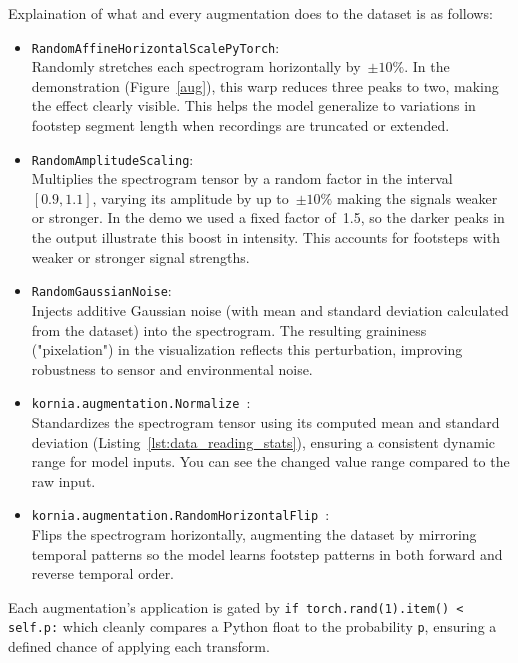 Explaination of what and every augmentation does to the dataset is as follows:
\begin{itemize}
    \item \texttt{RandomAffineHorizontalScalePyTorch}:\\
      Randomly stretches each spectrogram horizontally by~$\pm10\%$. In the demonstration (Figure~\ref{aug}), this warp reduces three peaks to two, making the effect clearly visible. This helps the model generalize to variations in footstep segment length when recordings are truncated or extended.
  
    \item \texttt{RandomAmplitudeScaling}:\\
      Multiplies the spectrogram tensor by a random factor in the interval~$[0.9,1.1]$, varying its amplitude by up to~$\pm10\%$ making the signals weaker or stronger. In the demo we used a fixed factor of~1.5, so the darker peaks in the output illustrate this boost in intensity. This accounts for footsteps with weaker or stronger signal strengths.
  
    \item \texttt{RandomGaussianNoise}:\\
      Injects additive Gaussian noise (with mean and standard deviation calculated from the dataset) into the spectrogram. The resulting graininess ("pixelation") in the visualization reflects this perturbation, improving robustness to sensor and environmental noise.
  
    \item \texttt{kornia.augmentation.Normalize~\cite{kornia}}:\\
      Standardizes the spectrogram tensor using its computed mean and standard deviation (Listing~\ref{lst:data_reading_stats}), ensuring a consistent dynamic range for model inputs. You can see the changed value range compared to the raw input.
  
    \item \texttt{kornia.augmentation.RandomHorizontalFlip~\cite{kornia}}:\\
      Flips the spectrogram horizontally, augmenting the dataset by mirroring temporal patterns so the model learns footstep patterns in both forward and reverse temporal order.
  \end{itemize}

Each augmentation's application is gated by \texttt{if torch.rand(1).item() < self.p:} which cleanly compares a Python float to the probability \texttt{p}, ensuring a defined chance of applying each transform.

